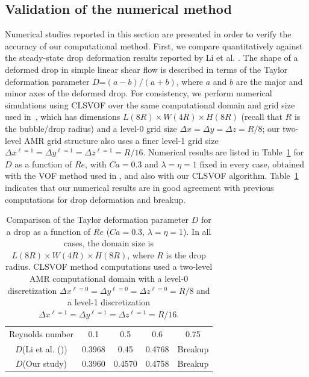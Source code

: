 \documentclass[%
 reprint,
 showkeys,
 amsmath,amssymb,
 aps,
 prfluids,
 onecolumn
]{revtex4-2}
\newcommand{\lwh}[3]{L(#1R)\times W(#2R) \times H(#3R)}
\begin{document}
\subsection{Validation of the numerical method}
Numerical studies reported in this section
are presented in order to verify the accuracy of our computational
method.  First, we compare quantitatively against the steady-state drop
deformation results reported by Li et al. \cite{LiRenRen00}.  The shape of a
deformed drop in simple linear shear flow is described in terms of the Taylor
deformation parameter {\color{red} $D$}=$(a-b)/(a+b)$, 
where $a$ and $b$ are the major and minor axes of the deformed drop.  
For consistency, we perform numerical simulations using CLSVOF over the same
computational domain and grid size used in~\cite{LiRenRen00}, which has dimensions 
$\lwh{8}{4}{8}$ (recall that $R$ is
the bubble/drop radius) and a level-0 grid size $\Delta x=\Delta y=\Delta
z=R/8$; our two-level AMR grid structure also uses a finer level-1 grid size
$\Delta x^{\ell=1} = \Delta y^{\ell=1} = \Delta z^{\ell=1} = R/16$.  Numerical
results are listed in Table~\ref{tab:DeComparison} for {\color{red} $D$} 
as a function of $Re$, with $Ca=0.3$ and $\lambda = \eta = 1$ fixed in every case, obtained with
the VOF method used in \cite{LiRenRen00}, and also with our CLSVOF algorithm.
Table~\ref{tab:DeComparison} indicates that our numerical results are in good
agreement with previous computations for drop deformation and breakup.
%
\begin{table}[tbh]
\caption{Comparison of the Taylor deformation parameter {\color{red} $D$} 
for a drop as a function 
         of $Re$ ($Ca=0.3$, $\lambda = \eta = 1$). In all cases, the domain 
         size is $\lwh{8}{4}{8}$, where $R$ is the drop radius.
         CLSVOF method computations used a two-level AMR computational domain 
         with a level-0 discretization $\Delta x^{\ell=0} = \Delta y^{\ell=0} 
         = \Delta z^{\ell=0} = R/8$ and a level-1 discretization
         $\Delta x^{\ell=1} = \Delta y^{\ell=1} = \Delta z^{\ell=1} = R/16$.}
\label{tab:DeComparison}
\center
\begin{tabular}{ c  c  c  c  c }
\hline
\hline
Reynolds number                      & 0.1     & 0.5     & 0.6     & 0.75      \\
{\color{red} $D$}(Li et al. (\cite{LiRenRen00}))  & 0.3968  & 0.45    & 0.4768  & Breakup   \\
{\color{red} $D$}(Our study) & 0.3960  & 0.4570  & 0.4758  & Breakup   \\
\hline
\hline
\end{tabular}
\end{table}
\end{document}
